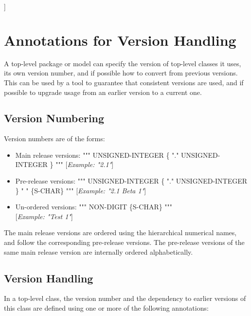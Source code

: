 \documentclass[10pt,a4paper]{report}
\def\doublelabel#1{\label{#1}\hypertarget{#1}{}}
\begin{document}
{]}

\section{Annotations for Version Handling}\doublelabel{annotations-for-version-handling}

A top-level package or model can specify the version of top-level
classes it uses, its own version number, and if possible how to convert
from previous versions. This can be used by a tool to guarantee that
consistent versions are used, and if possible to upgrade usage from an
earlier version to a current one.

\subsection{Version Numbering}\doublelabel{version-numbering}

Version numbers are of the forms:

\begin{itemize}
\item
  Main release versions: """ UNSIGNED-INTEGER \{ "." UNSIGNED-INTEGER \}
  """ {[}\emph{Example: "2.1"}{]}
\item
  Pre-release versions: """ UNSIGNED-INTEGER \{ "." UNSIGNED-INTEGER \}
  " " \{S-CHAR\} """ {[}\emph{Example: "2.1 Beta 1"}{]}
\item
  Un-ordered versions: """ NON-DIGIT \{S-CHAR\} """\\
  {[}\emph{Example: "Test 1"}{]}
\end{itemize}

The main release versions are ordered using the hierarchical numerical
names, and follow the corresponding pre-release versions. The
pre-release versions of the same main release version are internally
ordered alphabetically.

\subsection{Version Handling}\doublelabel{version-handling}

In a top-level class, the version number and the dependency to earlier
versions of this class are defined using one or more of the following
annotations:
\end{document}
